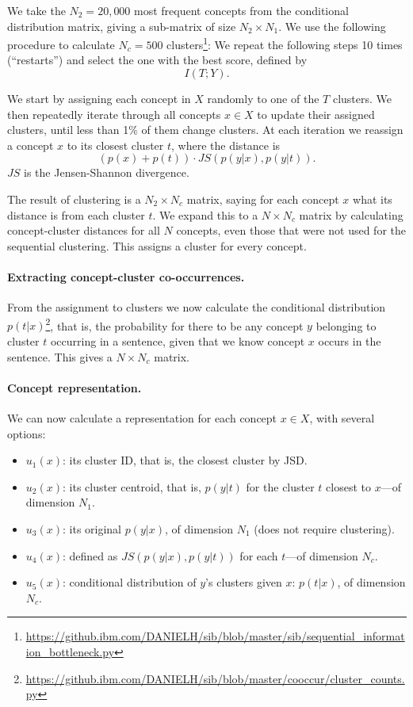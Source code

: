 \documentclass[11pt,a4paper]{article}
\begin{document}
We take the $N_2=20,000$ most frequent concepts from the
conditional distribution matrix, giving a sub-matrix of size $N_2\times N_1$.
We use the following procedure to calculate $N_c=500$
clusters\footnote{\url{https://github.ibm.com/DANIELH/sib/blob/master/sib/sequential_information_bottleneck.py}}:
We repeat the following steps 10 times (``restarts'') and select the one
with the best score, defined by
\[
I(T;Y).
\]

We start by assigning each concept in $X$ randomly to one of the $T$ clusters.
We then repeatedly iterate through all concepts $x\in X$ to update their assigned
clusters, until less than 1\% of them change clusters.
At each iteration we reassign a concept $x$ to its closest cluster $t$,
where the distance is
\[
(p(x)+p(t))\cdot JS(p(y|x),p(y|t)).
\]
$JS$ is the Jensen-Shannon divergence.

The result of clustering is a $N_2 \times N_c$ matrix,
saying for each concept $x$ what its distance is from each cluster $t$.
We expand this to a $N\times N_c$ matrix by calculating concept-cluster
distances for all $N$ concepts, even those that were not used for the
sequential clustering.
This assigns a cluster for every concept.

\paragraph{Extracting concept-cluster co-occurrences.}

From the assignment to clusters we now calculate the conditional distribution
$p(t|x)$\footnote{\url{https://github.ibm.com/DANIELH/sib/blob/master/cooccur/cluster_counts.py}},
that is, the probability for there to be any concept $y$ belonging to cluster $t$
occurring in a sentence, given that we know concept $x$ occurs in the sentence.
This gives a $N\times N_c$ matrix.

\paragraph{Concept representation.}

We can now calculate a representation for each concept $x\in X$,
with several options:
\begin{itemize}
\item $u_1(x)$: its cluster ID, that is, the closest cluster by JSD.
\item $u_2(x)$: its cluster centroid, that is, $p(y|t)$ for the cluster
  $t$ closest to $x$---of dimension $N_1$.
\item $u_3(x)$: its original $p(y|x)$, of dimension $N_1$ (does not require clustering).
\item $u_4(x)$: defined as $JS(p(y|x),p(y|t))$ for each $t$---of dimension $N_c$.
\item $u_5(x)$: conditional distribution of $y$'s clusters given $x$: $p(t|x)$,
  of dimension $N_c$.
\end{itemize}
\end{document}
